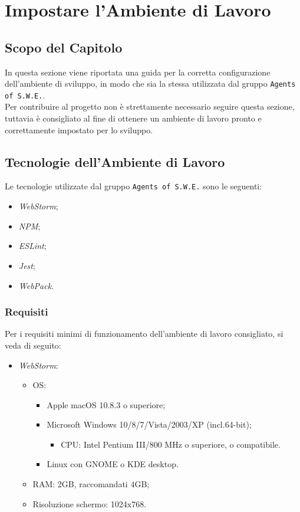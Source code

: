 \section{Impostare l'Ambiente di Lavoro}\label{AmbienteLavoro}
\subsection{Scopo del Capitolo}\label{AmbienteLavoro_scopo}
In questa sezione viene riportata una guida per la corretta configurazione dell'ambiente di sviluppo, in modo che sia la stessa utilizzata dal gruppo \texttt{Agents of S.W.E.}.\\
Per contribuire al progetto non è strettamente necessario seguire questa sezione, tuttavia è consigliato al fine di ottenere un ambiente di lavoro pronto e correttamente impostato per lo sviluppo.

\subsection{Tecnologie dell'Ambiente di Lavoro}
Le tecnologie utilizzate dal gruppo \texttt{Agents of S.W.E.} sono le seguenti:
\begin{itemize}
	\item \textit{WebStorm};
	\item \textit{NPM};
	\item \textit{ESLint};
	\item \textit{Jest};
	\item \textit{WebPack}.
\end{itemize}

\subsubsection{Requisiti}\label{AmbienteLavoro_requisiti}
Per i requisiti minimi di funzionamento dell'ambiente di lavoro consigliato, si veda di seguito:
\begin{itemize}
	\item \textit{WebStorm}:
	\begin{itemize}
		\item OS: 
			\begin{itemize}
				\item Apple macOS 10.8.3 o superiore;
				\item Microsoft Windows 10/8/7/Vista/2003/XP (incl.64-bit);
				\begin{itemize}
					\item CPU: Intel Pentium III/800 MHz o superiore, o compatibile.
				\end{itemize}
				\item Linux con GNOME o KDE desktop.
			\end{itemize}
		\item RAM: 2GB, raccomandati 4GB;
		\item Risoluzione schermo: 1024x768.
	\end{itemize}
\end{itemize}


